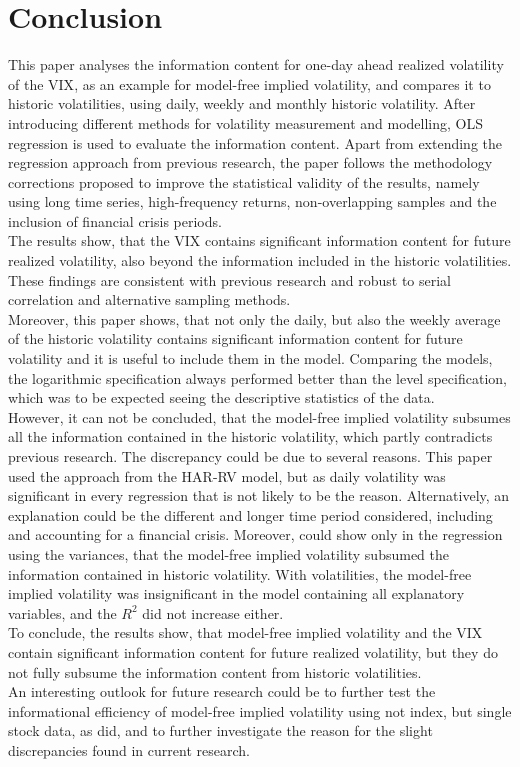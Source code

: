 
\section{Conclusion}\label{sec:6Discussion}
This paper analyses the information content for one-day ahead realized volatility of the \ac{VIX}, as an example for model-free implied volatility, and compares it to historic volatilities, using daily, weekly and monthly historic volatility. After introducing different methods for volatility measurement and modelling, OLS regression is used to evaluate the information content. Apart from extending the regression approach from previous research, the paper follows the methodology corrections proposed to improve the statistical validity of the results, namely using long time series, high-frequency returns, non-overlapping samples and the inclusion of financial crisis periods.\\
The results show, that the \ac{VIX} contains significant information content for future realized volatility, also beyond the information included in the historic volatilities. These findings are consistent with previous research and robust to serial correlation and alternative sampling methods. \\
Moreover, this paper shows, that not only the daily, but also the weekly average of the  historic volatility contains significant information content for future volatility and it is useful to include them in the model. Comparing the models, the logarithmic specification always performed better than the level specification, which was to be expected seeing the descriptive statistics of the data. \\
However, it can not be concluded, that the model-free implied volatility subsumes all the information contained in the historic volatility, which partly contradicts previous research. The discrepancy could be due to several reasons. This paper used the approach from the HAR-RV model, but as daily volatility was significant in every regression that is not likely to be the reason. Alternatively, an explanation could be the different and longer time period considered, including and accounting for a financial crisis. Moreover, \textcite{jiang2003} could show only in the regression using the variances, that the model-free implied volatility subsumed the information contained in historic volatility. With volatilities, the model-free implied volatility was insignificant in the model containing all explanatory variables, and the $R^{2}$ did not increase either.\\
To conclude, the results show, that model-free implied volatility and the VIX contain significant information content for future realized volatility, but they do not fully subsume the information content from historic volatilities.\\
An interesting outlook for future research could be to further test the informational efficiency of model-free implied volatility using not index, but single stock data, as \textcite{taylor2010} did, and to further investigate the reason for the slight discrepancies found in current research.

